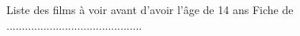 \documentclass[a4paper]{article}
\begin{document}
\begin{center}
{\Large Liste des films à voir avant d'avoir l'âge de 14 ans}
\newline
\newline
{\Large Fiche de ............................................}
\end{center}
\thispagestyle{empty}
\end{document}
